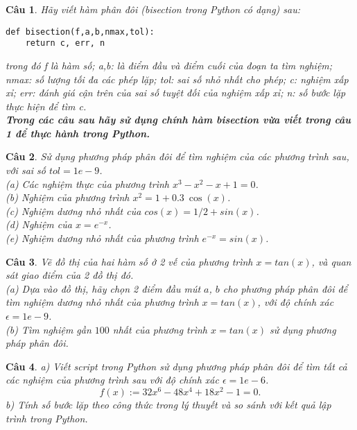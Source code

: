 \documentclass[11pt]{article}
\newtheorem{bt}{Câu}
\begin{document}


\begin{bt}
Hãy viết hàm phân đôi (bisection trong Python có dạng) sau:
%
\begin{lstlisting}[frame=single] 
def bisection(f,a,b,nmax,tol):
    return c, err, n
\end{lstlisting}
%
trong đó f là hàm số; a,b: là điểm đầu và điểm cuối của đoạn ta tìm nghiệm; nmax: số lượng tối đa các phép lặp; tol: sai số nhỏ nhất cho phép; c: nghiệm xấp xỉ;
err: đánh giá cận trên của sai số tuyệt đối của nghiệm xấp xỉ; n: số bước lặp thực hiện để tìm c.\\
\textbf{Trong các câu sau hãy sử dụng chính hàm bisection vừa viết trong câu 1 để thực hành trong Python.}
\end{bt}

\begin{bt} 
Sử dụng phương pháp phân đôi để tìm nghiệm của các phương trình sau, với sai số $tol=1e-9$.\\ 
(a) Các nghiệm thực của phương trình $x^3 - x^2 - x + 1 = 0$. \\
(b) Nghiệm của phương trình $x^2 = 1 + 0.3\ \cos(x)$. \\
(c) Nghiệm dương nhỏ nhất của $cos(x) = 1/2 + sin (x)$. \\
(d) Nghiệm của $x = e^{-x}$. \\
(e) Nghiệm dương nhỏ nhất của phương trình $e^{-x} = sin(x)$. 
\end{bt}

\begin{bt}
	Vẽ đồ thị của hai hàm số ở 2 vế của phương trình $x = tan(x)$, và quan sát giao điểm của 2 đồ thị đó.\\
	(a) Dựa vào đồ thị, hãy chọn 2 điểm đầu mút $a$, $b$ cho phương pháp phân đôi để tìm nghiệm dương nhỏ nhất của phương trình $x = tan (x)$, với độ chính xác 
	$\epsilon=1e-9$. \\
	(b) Tìm nghiệm gần $100$ nhất của phương trình $x = tan(x)$ sử dụng phương pháp phân đôi.
\end{bt}

\begin{bt}
a) Viết script trong Python sử dụng phương pháp phân đôi để tìm tất cả các nghiệm của phương trình sau với độ chính xác $\epsilon=1e-6$.
\[ f(x) := 32x^6 - 48x^4 +18x^2 - 1 = 0.  \] 
b) Tính số bước lặp theo công thức trong lý thuyết và so sánh với kết quả lập trình trong Python.
\end{bt}
\end{document}
